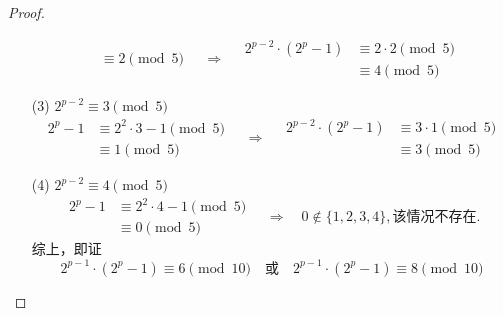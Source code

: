 \documentclass[UTF8]{ctexart}
\begin{document}
\begin{proof}
\begin{enumerate}
\[\begin{aligned}
                & \equiv
                2 \pmod{5} 
            \end{aligned}
            \quad \Rightarrow\quad 
            \begin{aligned}
                2^{p-2}\cdot (2^p - 1) 
                & \equiv
                2\cdot 2 \pmod{5}\\
                & \equiv
                4 \pmod{5}
            \end{aligned}
        \]
        \item [(3)]$2^{p-2}\equiv 3 \pmod{5}$
        \[
            \begin{aligned}
                2^{p} - 1 
                & \equiv  
                2^2\cdot 3  - 1 \pmod{5}\\
                & \equiv
                1 \pmod{5} 
            \end{aligned}
            \quad \Rightarrow\quad 
            \begin{aligned}
                2^{p-2}\cdot (2^p - 1) 
                & \equiv
                3\cdot 1 \pmod{5}\\
                & \equiv
                3 \pmod{5}
            \end{aligned}
        \]
        \item [(4)]$2^{p-2}\equiv 4 \pmod{5}$
        \[
            \begin{aligned}
                2^{p} - 1 
                & \equiv  
                2^2\cdot 4  - 1 \pmod{5}\\
                & \equiv
                0 \pmod{5} 
            \end{aligned}
            \quad \Rightarrow\quad 
            0\notin \{1,2,3,4\},
            \mbox{该情况不存在}.
        \]
        综上，即证
        \[
            2^{p-1}\cdot (2^p - 1) \equiv 6 \pmod{10}
            \quad
            \mbox{或}    
            \quad
            2^{p-1}\cdot (2^p - 1) \equiv 8 \pmod{10}
        \]
    \end{enumerate}
\end{proof}
\end{document}
